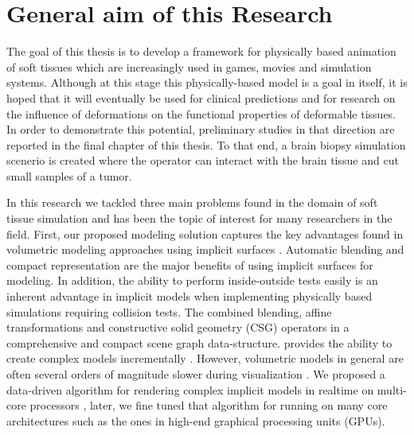 

\label{chapter:introduction}
\section{General aim of this Research}
The goal of this thesis is to develop a framework for physically based animation of soft tissues which are increasingly used in
games, movies and simulation systems. Although at this stage this physically-based model is a goal in itself, it is hoped that
it will eventually be used for clinical predictions and for research on the influence of deformations on the functional properties 
of deformable tissues. In order to demonstrate this potential, preliminary studies in that direction are reported in the final chapter
of this thesis. To that end, a brain biopsy simulation scenerio is created where the operator can interact with the brain tissue and 
cut small samples of a tumor. 

In this research we tackled three main problems found in the domain of soft tissue simulation and has been the topic of interest for many
researchers in the field. First, our proposed modeling solution captures the key advantages found in volumetric modeling approaches using 
implicit surfaces \cite{Bloomenthal1997, Wyvill1986, Wyvill1999, Wyvill1996, Wyvill1997, Schmidt2006, Bernhardt2010a}. Automatic blending and compact 
representation are the major benefits of using implicit surfaces for modeling. In addition, the ability to perform inside-outside tests 
easily is an inherent advantage in implicit models when implementing physically based simulations requiring collision tests. 
The \blob \cite{Wyvill1999} combined blending, affine transformations and constructive solid geometry (CSG) operators in a 
comprehensive and compact scene graph data-structure. \blob provides the ability to create complex models incrementally \cite{Schmidt2006}. 
However, volumetric models in general are often several orders of magnitude slower during visualization \cite{Bloomenthal1990a, Bloomenthal1997}.
We proposed a data-driven algorithm for rendering complex implicit models in realtime on multi-core processors \cite{Shirazian2012}, later, we 
fine tuned that algorithm for running on many core architectures such as the ones in high-end graphical processing units (GPUs). 

